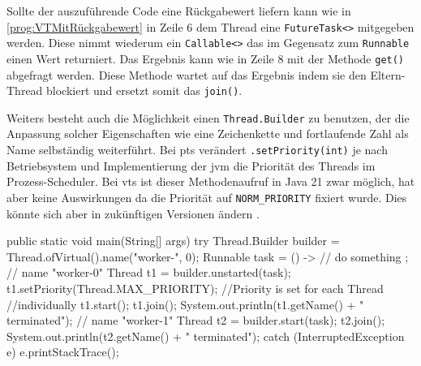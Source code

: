     \begin{program} [H]
        \caption{\Glspl{vt} mit Rückgabewert}
        \label{prog:VTMitRückgabewert}
    \begin{JavaCode}[language=Java, numbers=left]
public static void main(String[] args) {
    FutureTask<String> futureTask = new FutureTask<>(() -> {
        Thread.sleep(1000);
        return "Task completed";
    });
    Thread.ofVirtual().start(futureTask);
    try {
        System.out.println(STR."Result: \{futureTask.get()}");
    } catch (Exception e) {
        e.printStackTrace();
    }
}\end{JavaCode}
    \end{program}
    Sollte der auszuführende Code eine Rückgabewert liefern kann wie in \ref{prog:VTMitRückgabewert} in Zeile 6 dem Thread eine \texttt{FutureTask<>} mitgegeben werden. Diese nimmt wiederum
    ein \texttt{Callable<>} das im Gegensatz zum \texttt{Runnable} einen Wert returniert. Das Ergebnis kann wie in Zeile 8 mit der Methode \texttt{get()} abgefragt werden.
    Diese Methode wartet auf das Ergebnis indem sie den Eltern-Thread blockiert und ersetzt somit das \texttt{join()}.



    Weiters besteht auch die Möglichkeit einen \texttt{Thread.Builder} zu benutzen, der die Anpassung solcher Eigenschaften wie eine Zeichenkette und fortlaufende Zahl
    als Name selbständig weiterführt.
    Bei \Glspl{pt} verändert \texttt{.setPriority(int)} je nach Betriebsystem und Implementierung der \gls{jvm} die Priorität des Threads im Prozess-Scheduler. Bei \Glspl{vt} ist dieser Methodenaufruf in Java 21 zwar
    möglich, hat aber keine Auswirkungen da die Priorität auf \texttt{NORM\_PRIORITY} fixiert wurde. Dies könnte sich aber in zukünftigen Versionen ändern \cite{JEP444}.

    
    
    \begin{program} [H]
        \caption{Beispiel eines \texttt{Thread.Builder.OfVirtual} in Java}
        \label{prog:ErstellungEinesVTBuilders}
    \begin{JavaCode}[language=Java, numbers=left]
public static void main(String[] args) {
    try {
        Thread.Builder builder = Thread.ofVirtual().name("worker-", 0);
        Runnable task = () -> {
            // do something
        };
        // name "worker-0"
        Thread t1 = builder.unstarted(task);
        t1.setPriority(Thread.MAX_PRIORITY);    //Priority is set for each Thread 
                                                //individually   
        t1.start(); t1.join();
        System.out.println(t1.getName() + " terminated");
        // name "worker-1"
        Thread t2 = builder.start(task);   
        t2.join();  
        System.out.println(t2.getName() + " terminated");
    } catch (InterruptedException e) {
        e.printStackTrace();
    }
}\end{JavaCode}
    \end{program}

